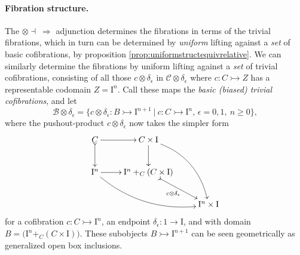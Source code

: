 \documentclass[12pt]{article}
\newcommand{\mono}{\ensuremath{\rightarrowtail}}
\newcommand{\ra}{\ensuremath{\rightarrow}}
\newcommand{\I}{\ensuremath{\mathrm{I}}}
\theoremstyle{remark}
\theoremstyle{definition}
\begin{document}
\paragraph{Fibration structure.}
The $\otimes\dashv\ \Rightarrow$ adjunction determines the fibrations in terms of the trivial fibrations, which in turn can be determined by \emph{uniform} lifting against a \emph{set} of basic cofibrations, by proposition \ref{prop:uniformstructequivrelative}.  We can similarly determine the fibrations by uniform lifting against a \emph{set} of trivial cofibrations, consisting of all those $c \otimes \delta_\epsilon$ in $\mathcal{C}\otimes \delta_\epsilon$ where $c : C \mono Z$ has a representable codomain $Z=\I^n$.  
Call these maps the \emph{basic (biased) trivial cofibrations}, and let 
\begin{equation}\label{eq:basicTCof}
\mathcal{B}\otimes \delta_\epsilon = \{c \otimes \delta_\epsilon : B \mono \I^{n+1}\ |\ c : C\mono \I^n,\,\epsilon = 0,1,\ n\geq 0 \},
\end{equation}
where the pushout-product $c\otimes\delta_\epsilon$ now takes the simpler form
\begin{equation}\label{diagram:basicpushoutproduct}
\xymatrix{
C \ar@{>->}[d] \ar[r] & C\times \I \ar[d] \ar@/^4ex/ [rdd]\\
\I^{n} \ar@/_4ex/ [rrd] \ar[r] &  \I^n +_C (C\times\I) \ar@{>->}[rd]_{c \otimes \delta_\epsilon} \\
&& \I^{n}\times\I
}
\end{equation}
for a cofibration $c : C\mono \I^n$, an endpoint $\delta_\epsilon:1 \ra \I$, and with domain $B = \big(\I^n +_C (C\times\I)\big)$.   These subobjects $B \mono \I^{n+1}$ can be seen geometrically as generalized open box inclusions.
\end{document}
